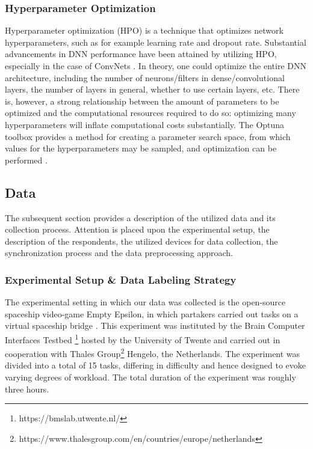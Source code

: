 \documentclass[fleqn,11pt]{paper}
\begin{document}
\subsubsection*{Hyperparameter Optimization}
Hyperparameter optimization (HPO) is a technique that optimizes network hyperparameters, such as for example learning rate and dropout rate. Substantial advancements in DNN performance have been attained by utilizing HPO, especially in the case of ConvNets \cite{bergstra2012random}. In theory, one could optimize the entire DNN architecture, including the number of neurons/filters in dense/convolutional layers, the number of layers in general, whether to use certain layers, etc. There is, however, a strong relationship between the amount of parameters to be optimized and the computational resources required to do so: optimizing many hyperparameters will inflate computational costs substantially. The Optuna toolbox provides a method for creating a parameter search space, from which values for the hyperparameters may be sampled, and optimization can be performed \cite{akiba2019optuna}. 

\subsection{Data} \label{sec:data}
The subsequent section provides a description of the utilized data and its collection process. Attention is placed upon the experimental setup, the description of the respondents, the utilized devices for data collection, the synchronization process and the data preprocessing approach. 

\subsubsection*{Experimental Setup \& Data Labeling Strategy}
The experimental setting in which our data was collected is the open-source spaceship video-game Empty Epsilon, in which partakers carried out tasks on a virtual spaceship bridge \cite{daid2016empty}. This experiment was instituted by the Brain Computer Interfaces Testbed \footnote{https://bmslab.utwente.nl/} hosted by the University of Twente and carried out in cooperation with Thales Group\footnote{https://www.thalesgroup.com/en/countries/europe/netherlands} Hengelo, the Netherlands. The experiment was divided into a total of 15 tasks, differing in difficulty and hence designed to evoke varying degrees of workload. The total duration of the experiment was roughly three hours.  
\end{document}
